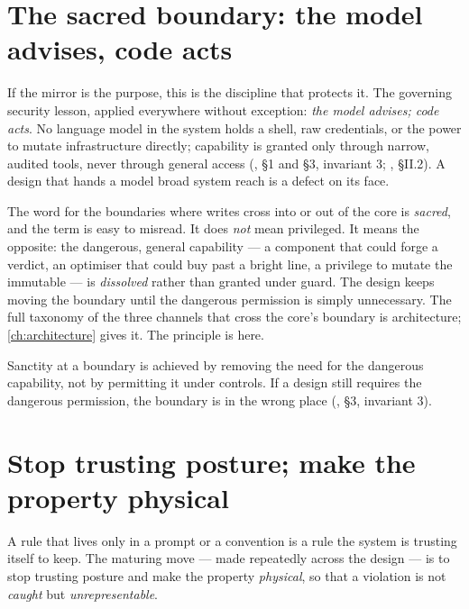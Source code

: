 \section{The sacred boundary: the model advises, code acts}
\label{sec:sacred}

If the mirror is the purpose, this is the discipline that protects it. The
governing security lesson, applied everywhere without exception: \emph{the model
advises; code acts}. No language model in the system holds a shell, raw
credentials, or the power to mutate infrastructure directly; capability is granted
only through narrow, audited tools, never through general access
(, \S 1 and \S 3, invariant 3;
, \S II.2). A design that hands a model broad
system reach is a defect on its face.

The word for the boundaries where writes cross into or out of the core is
\emph{sacred}, and the term is easy to misread. It does \emph{not} mean privileged.
It means the opposite: the dangerous, general capability --- a component that could
forge a verdict, an optimiser that could buy past a bright line, a privilege to
mutate the immutable --- is \emph{dissolved} rather than granted under guard. The
design keeps moving the boundary until the dangerous permission is simply
unnecessary. The full taxonomy of the three channels that cross the core's boundary
is architecture; \autoref{ch:architecture} gives it. The principle is here.

\begin{principle}
Sanctity at a boundary is achieved by removing the need for the dangerous
capability, not by permitting it under controls. If a design still requires the
dangerous permission, the boundary is in the wrong place
(, \S 3, invariant 3).
\end{principle}

\section{Stop trusting posture; make the property physical}
\label{sec:structural}

A rule that lives only in a prompt or a convention is a rule the system is trusting
itself to keep. The maturing move --- made repeatedly across the design --- is to
stop trusting posture and make the property \emph{physical}, so that a violation is
not \emph{caught} but \emph{unrepresentable}.

